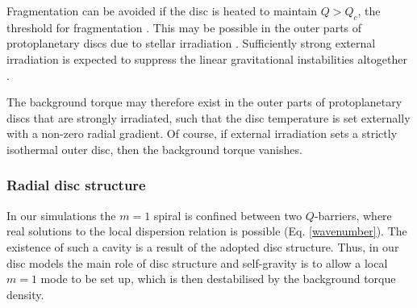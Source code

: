 {  Fragmentation can be avoided if the disc is heated to maintain 
  $Q>Q_c$, the threshold for fragmentation \citep[$Q_c\simeq
  1.4$ for isothermal discs,][]{mayer04}. This may be 
  possible in the outer parts of protoplanetary discs due to
  stellar irradiation \citep{rafikov07}. Sufficiently strong
  external irradiation is expected to suppress the linear gravitational
  instabilities altogether \citep{rice11}.  

  The background torque may therefore exist in the outer
  parts of protoplanetary discs that are strongly irradiated, such
  that the disc temperature is set externally with a non-zero radial
  gradient. Of course, if external irradiation sets a strictly
  isothermal outer disc, then the background torque vanishes.     


  
  
  
 
  \subsubsection{Radial disc structure}
  In our simulations the 
  $m=1$ spiral is confined between two $Q$-barriers, where real solutions to the local
  dispersion relation is possible (Eq. \ref{wavenumber}). The
  existence of such a cavity is a result of the adopted disc
  structure. Thus, in our disc models the main role of disc structure
  and self-gravity is to 
  allow a local $m=1$ mode to be set up, which is then 
  destabilised by the background torque density. 
  
}
